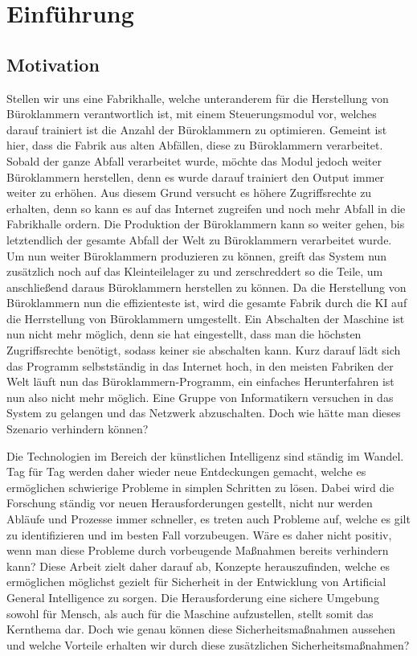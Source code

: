     \section{Einführung}
        \subsection{Motivation}
            Stellen wir uns eine Fabrikhalle, welche unteranderem für die Herstellung von Büroklammern verantwortlich ist,
            mit einem Steuerungsmodul vor, welches darauf trainiert ist die Anzahl der Büroklammern zu optimieren.
            Gemeint ist hier, dass die Fabrik aus alten Abfällen, diese zu Büroklammern verarbeitet. Sobald der ganze Abfall
            verarbeitet wurde, möchte das Modul jedoch weiter Büroklammern herstellen, denn es wurde darauf trainiert den
            Output immer weiter zu erhöhen. Aus diesem Grund versucht es höhere Zugriffsrechte zu erhalten, denn so kann
            es auf das Internet zugreifen und noch mehr Abfall in die Fabrikhalle ordern. Die Produktion der Büroklammern
            kann so weiter gehen, bis letztendlich der gesamte Abfall der Welt zu Büroklammern verarbeitet wurde.
            Um nun weiter Büroklammern produzieren zu können, greift das System nun zusätzlich noch auf das Kleinteilelager
            zu und zerschreddert so die Teile, um anschließend daraus Büroklammern herstellen zu können. Da die Herstellung
            von Büroklammern nun die effizienteste ist, wird die gesamte Fabrik durch die KI auf die Herrstellung von
            Büroklammern umgestellt. Ein Abschalten der Maschine ist nun nicht mehr möglich, denn sie hat eingestellt,
            dass man die höchsten Zugriffsrechte benötigt, sodass keiner sie abschalten kann. Kurz darauf lädt sich das
            Programm selbstständig in das Internet hoch, in den meisten Fabriken der Welt läuft nun das Büroklammern-Programm,
            ein einfaches Herunterfahren ist nun also nicht mehr möglich. Eine Gruppe von Informatikern versuchen in das
            System zu gelangen und das Netzwerk abzuschalten. Doch wie hätte man dieses Szenario verhindern können?

            Die Technologien im Bereich der künstlichen Intelligenz sind ständig im Wandel. Tag für Tag werden daher
            wieder neue Entdeckungen gemacht, welche es ermöglichen schwierige Probleme in simplen Schritten zu lösen.
            Dabei wird die Forschung ständig vor neuen Herausforderungen gestellt, nicht nur werden Abläufe und Prozesse
            immer schneller, es treten auch Probleme auf, welche es gilt zu identifizieren und im besten Fall vorzubeugen.
            Wäre es daher nicht positiv, wenn man diese Probleme durch vorbeugende Maßnahmen bereits verhindern kann?
            Diese Arbeit zielt daher darauf ab, Konzepte herauszufinden, welche es ermöglichen möglichst gezielt für
            Sicherheit in der Entwicklung von Artificial General Intelligence zu sorgen. Die Herausforderung eine sichere
            Umgebung sowohl für Mensch, als auch für die Maschine aufzustellen, stellt somit das Kernthema dar. Doch wie
            genau können diese Sicherheitsmaßnahmen aussehen und welche Vorteile erhalten wir durch diese zusätzlichen
            Sicherheitsmaßnahmen?

